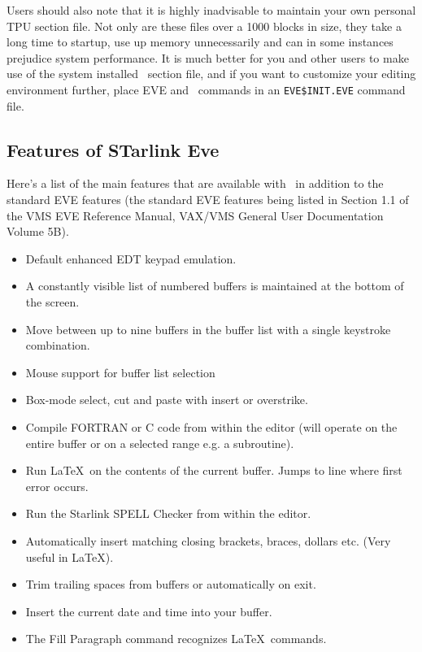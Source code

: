 Users should also note that it is highly inadvisable to maintain your own
personal TPU section file. Not only are these files over a 1000 blocks in size,
they take a long time to startup, use up memory unnecessarily and can in some
instances prejudice system performance. It is much better for you and other
users to make use of the system installed \STEve\ section file, and if you
want to customize your editing environment further, place EVE and \STEve\
commands in an {\tt EVE\$INIT.EVE} command file.

\subsection{Features of STarlink Eve}

Here's a list of the main features that are available with \STEve\, in addition
to the standard EVE features (the standard EVE features being listed in Section
1.1 of the VMS EVE Reference Manual, VAX/VMS General User Documentation Volume
5B).

\begin{itemize}

\item Default enhanced EDT keypad emulation.
\item A constantly visible list of numbered buffers is maintained at the
       bottom of the screen.
\item Move between up to nine buffers in the buffer list with a single
      keystroke combination.
\item Mouse support for buffer list selection
\item Box-mode select, cut and paste with insert or overstrike.
\item Compile FORTRAN or C code from within the editor (will operate on
      the entire buffer or on a selected range e.g. a subroutine).
\item Run \LaTeX\ on the contents of the current buffer. Jumps to
      line where first error occurs.
\item Run the Starlink SPELL Checker from within the editor.
\item Automatically insert matching closing brackets, braces, dollars etc.
      (Very useful in \LaTeX).
\item Trim trailing spaces from buffers or automatically on exit.
\item Insert the current date and time into your buffer.
\item The Fill Paragraph command recognizes \LaTeX\ commands.
\end{itemize}

